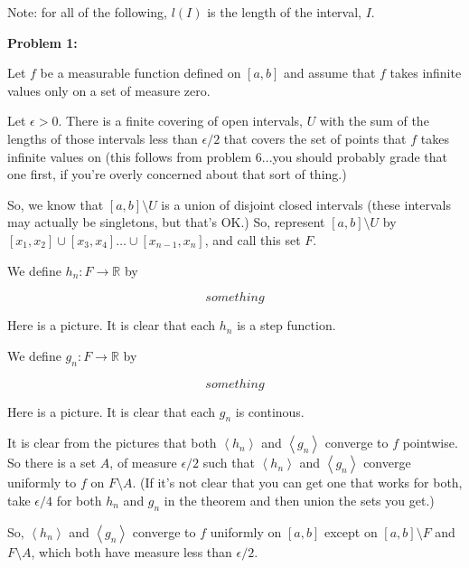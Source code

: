 \documentclass[a4paper,12pt]{article}
\newcommand{\shunt}{\vspace{20mm}}
\newcommand{\anbrack}[1]{\left\langle #1 \right\rangle}
\newcommand{\ep}{\epsilon}
\newcommand{\R}{\mathbb{R}}
\begin{document}
Note: for all of the following, $l(I)$ is the length of the interval, $I$.

{\bf Problem 1:} %

Let $f$ be a measurable function defined on $[a,b]$ and assume that $f$ takes infinite values only on a set of measure zero. 

Let $\ep >0$. There is a finite covering of open intervals, $U$ with the sum of the lengths of those intervals less than $\ep/2$ that covers the set of points that $f$ takes infinite values on (this follows from problem 6...you should probably grade that one first, if you're overly concerned about that sort of thing.)

So, we know that $[a,b] \setminus U$ is a union of disjoint closed intervals (these intervals may actually be singletons, but that's OK.) So, represent $[a,b] \setminus U$ by $[x_1,x_2] \cup [x_3,x_4] \ldots \cup [x_{n-1},x_n]$, and call this set $F$.

We define $h_n: F \to \R$ by

\begin{displaymath}
something
\end{displaymath}

Here is a picture. It is clear that each $h_n$ is a step function.

\shunt %

We define $g_n: F \to \R$ by

\begin{displaymath}
something
\end{displaymath}

Here is a picture. It is clear that each $g_n$ is continous.

\shunt %

It is clear from the pictures that both $\anbrack{h_n}$ and $\anbrack{g_n}$ converge to $f$ pointwise. So there is a set $A$, of measure $\ep/2$ such that $\anbrack{h_n}$ and $\anbrack{g_n}$ converge uniformly to $f$ on $F \setminus A$. (If it's not clear that you can get one that works for both, take $\ep/4$ for both $h_n$ and $g_n$ in the theorem and then union the sets you get.)

So, $\anbrack{h_n}$ and $\anbrack{g_n}$ converge to $f$ uniformly on $[a,b]$ except on $[a,b] \setminus F$ and $F \setminus A$, which both have measure less than $\ep/2$.
\end{document}

